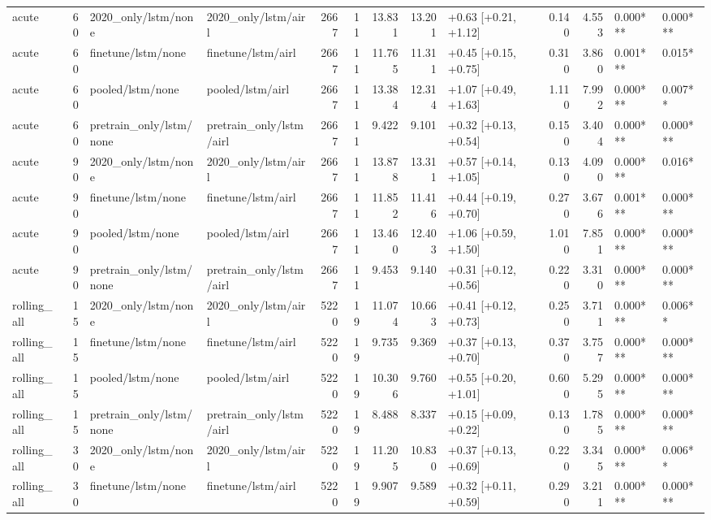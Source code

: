 \begin{tabular}{lrllrrrrlrrll}
acute & 60 & 2020_only/lstm/none & 2020_only/lstm/airl & 2667 & 11 & 13.831 & 13.201 & +0.63 [+0.21, +1.12] & 0.140 & 4.553 & 0.000*** & 0.000*** \\
acute & 60 & finetune/lstm/none & finetune/lstm/airl & 2667 & 11 & 11.765 & 11.311 & +0.45 [+0.15, +0.75] & 0.310 & 3.860 & 0.001*** & 0.015* \\
acute & 60 & pooled/lstm/none & pooled/lstm/airl & 2667 & 11 & 13.384 & 12.314 & +1.07 [+0.49, +1.63] & 1.110 & 7.992 & 0.000*** & 0.007** \\
acute & 60 & pretrain_only/lstm/none & pretrain_only/lstm/airl & 2667 & 11 & 9.422 & 9.101 & +0.32 [+0.13, +0.54] & 0.150 & 3.404 & 0.000*** & 0.000*** \\
acute & 90 & 2020_only/lstm/none & 2020_only/lstm/airl & 2667 & 11 & 13.878 & 13.311 & +0.57 [+0.14, +1.05] & 0.130 & 4.090 & 0.000*** & 0.016* \\
acute & 90 & finetune/lstm/none & finetune/lstm/airl & 2667 & 11 & 11.852 & 11.416 & +0.44 [+0.19, +0.70] & 0.270 & 3.676 & 0.001*** & 0.000*** \\
acute & 90 & pooled/lstm/none & pooled/lstm/airl & 2667 & 11 & 13.460 & 12.403 & +1.06 [+0.59, +1.50] & 1.010 & 7.851 & 0.000*** & 0.000*** \\
acute & 90 & pretrain_only/lstm/none & pretrain_only/lstm/airl & 2667 & 11 & 9.453 & 9.140 & +0.31 [+0.12, +0.56] & 0.220 & 3.310 & 0.000*** & 0.000*** \\
rolling_all & 15 & 2020_only/lstm/none & 2020_only/lstm/airl & 5220 & 19 & 11.074 & 10.663 & +0.41 [+0.12, +0.73] & 0.250 & 3.711 & 0.000*** & 0.006** \\
rolling_all & 15 & finetune/lstm/none & finetune/lstm/airl & 5220 & 19 & 9.735 & 9.369 & +0.37 [+0.13, +0.70] & 0.370 & 3.757 & 0.000*** & 0.000*** \\
rolling_all & 15 & pooled/lstm/none & pooled/lstm/airl & 5220 & 19 & 10.306 & 9.760 & +0.55 [+0.20, +1.01] & 0.600 & 5.295 & 0.000*** & 0.000*** \\
rolling_all & 15 & pretrain_only/lstm/none & pretrain_only/lstm/airl & 5220 & 19 & 8.488 & 8.337 & +0.15 [+0.09, +0.22] & 0.130 & 1.785 & 0.000*** & 0.000*** \\
rolling_all & 30 & 2020_only/lstm/none & 2020_only/lstm/airl & 5220 & 19 & 11.205 & 10.830 & +0.37 [+0.13, +0.69] & 0.220 & 3.345 & 0.000*** & 0.006** \\
rolling_all & 30 & finetune/lstm/none & finetune/lstm/airl & 5220 & 19 & 9.907 & 9.589 & +0.32 [+0.11, +0.59] & 0.290 & 3.211 & 0.000*** & 0.000*** \\

\end{tabular}
